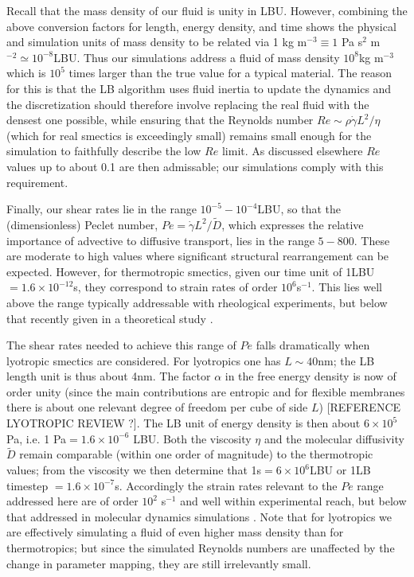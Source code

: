 \documentclass[8.5pt,twoside,twocolumn]{article}
\begin{document}
Recall that the mass density of our fluid is unity in LBU. However, combining the above conversion factors for length,  energy density, and time shows the physical and simulation units of mass density to be related via 1 kg m$^{-3} \equiv 1$ Pa s$^2$ m$^{-2} \simeq 10^{-8}$LBU. Thus our simulations address a fluid of mass density $10^8$kg m$^{-3}$ which is $10^5$ times larger than the true value for a typical material. The reason for this is that the LB algorithm uses fluid inertia to update the dynamics and the discretization should therefore involve replacing the real fluid with the densest one possible, while ensuring that the Reynolds number $Re \sim \rho\dot\gamma L^2/\eta$ (which for real smectics is exceedingly small) remains small enough for the simulation to faithfully describe the low $Re$ limit. As discussed elsewhere \cite{Cates04, Cates09} $Re$ values up to about 0.1 are then admissable; our simulations comply with this requirement. 

Finally, our shear rates lie in the range 
$10^{-5}-10^{-4}$LBU, so that the (dimensionless) Peclet number, $Pe =\dot\gamma L^2/\tilde D$, which expresses the relative importance of advective to diffusive transport, lies in the range $5-800$. These are moderate to high values where significant structural rearrangement can be expected. However, for thermotropic smectics, given our time unit of 1LBU$=1.6\times 10^{-12}$s, they correspond to strain rates of order $10^6$s$^{-1}$. This lies well above the range typically addressable with rheological experiments, but below that recently given in a theoretical study \cite{Stewart2009}.

The shear rates needed to achieve this range of $Pe$ falls dramatically when lyotropic smectics are considered. For lyotropics one has $L\sim 40$nm; the LB length unit is thus about 4nm. The factor $\alpha$ in the free energy density is now of order unity (since the main contributions are entropic and for flexible membranes there is about one relevant degree of freedom per cube of side $L$) [REFERENCE LYOTROPIC REVIEW ?]. The LB unit of energy density is then about $6\times 10^{5}$Pa, i.e. 1 Pa$= 1.6 \times 10^{-6}$ LBU. Both the viscosity $\eta$ and the molecular diffusivity $\tilde D$ remain comparable (within one order of magnitude) to the thermotropic values; from the viscosity we then determine that 1s$=6\times 10^6$LBU or 1LB timestep $=1.6\times 10^{-7}$s. Accordingly the strain rates relevant to the $Pe$ range addressed here are of order $10^2$ s$^{-1}$ and well within experimental reach, but below that addressed in molecular dynamics simulations \cite{Guo2002,Soddemann2004}. Note that for lyotropics we are effectively simulating a fluid of even higher mass density than for thermotropics; but since the simulated Reynolds numbers are unaffected by the change in parameter mapping, they are still irrelevantly small. 
\end{document}
